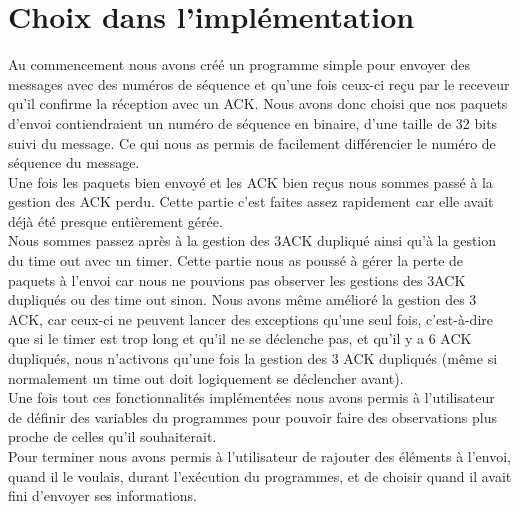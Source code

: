 \documentclass[a4paper,10pt]{article}
\begin{document}
\section{Choix dans l'implémentation}
Au commencement nous avons créé un programme simple pour envoyer des messages avec des numéros de séquence et qu'une fois ceux-ci reçu par le receveur qu'il confirme la réception avec un ACK. Nous avons donc choisi que nos paquets d'envoi contiendraient un numéro de séquence en binaire, d'une taille de 32 bits suivi du message. Ce qui nous as permis de facilement différencier le numéro de séquence du message.\\
Une fois les paquets bien envoyé et les ACK bien reçus nous sommes passé à la gestion des ACK perdu. Cette partie c'est faites assez rapidement car elle avait déjà été presque entièrement gérée.\\
Nous sommes passez après à la gestion des 3ACK dupliqué ainsi qu'à la gestion du time out avec un timer. Cette partie nous as poussé à gérer la perte de paquets à l'envoi car nous ne pouvions pas observer les gestions des 3ACK dupliqués ou des time out sinon. Nous avons même amélioré la gestion des 3 ACK, car ceux-ci ne peuvent lancer des exceptions qu'une seul fois, c'est-à-dire que si le timer est trop long et qu'il ne se déclenche pas, et qu'il y a 6 ACK dupliqués, nous n'activons qu'une fois la gestion des 3 ACK dupliqués (même si normalement un time out doit logiquement se déclencher avant).\\
Une fois tout ces fonctionnalités implémentées nous avons permis à l'utilisateur de définir des variables du programmes pour pouvoir faire des observations plus proche de celles qu'il souhaiterait.\\
Pour terminer nous avons permis à l'utilisateur de rajouter des éléments à l'envoi, quand il le voulais, durant l'exécution du programmes, et de choisir quand il avait fini d'envoyer ses informations.\\
\end{document}
